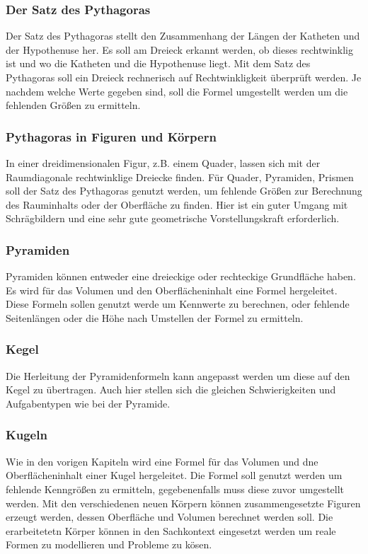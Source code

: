 \documentclass{article}
\begin{document}
\subsubsection*{Der Satz des Pythagoras}
Der Satz des Pythagoras stellt den Zusammenhang der Längen der Katheten und der Hypothenuse her.
Es soll am Dreieck erkannt werden, ob dieses rechtwinklig ist und wo die Katheten und die Hypothenuse liegt.
Mit dem Satz des Pythagoras soll ein Dreieck rechnerisch auf Rechtwinkligkeit überprüft werden. 
Je nachdem welche Werte gegeben sind, soll die Formel umgestellt werden um die fehlenden Größen zu ermitteln.
\subsubsection*{Pythagoras in Figuren und Körpern}
In einer dreidimensionalen Figur, z.B. einem Quader, lassen sich mit der Raumdiagonale rechtwinklige Dreiecke finden.
Für Quader, Pyramiden, Prismen soll der Satz des Pythagoras genutzt werden, um fehlende Größen zur Berechnung des Rauminhalts oder der Oberfläche zu finden.
Hier ist ein guter Umgang mit Schrägbildern und eine sehr gute geometrische Vorstellungskraft erforderlich.

\subsubsection*{Pyramiden}
Pyramiden können entweder eine dreieckige oder rechteckige Grundfläche haben. Es wird für das Volumen und den Oberflächeninhalt eine Formel hergeleitet.
Diese Formeln sollen genutzt werde um Kennwerte zu berechnen, oder fehlende Seitenlängen oder die Höhe nach Umstellen der Formel zu ermitteln.

\subsubsection*{Kegel}
Die Herleitung der Pyramidenformeln kann angepasst werden um diese auf den Kegel zu übertragen.
Auch hier stellen sich die gleichen Schwierigkeiten und Aufgabentypen wie bei der Pyramide.
\subsubsection*{Kugeln}
Wie in den vorigen Kapiteln wird eine Formel für das Volumen und dne Oberflächeninhalt einer Kugel hergeleitet.
Die Formel soll genutzt werden um fehlende Kenngrößen zu ermitteln, gegebenenfalls muss diese zuvor umgestellt werden.
Mit den verschiedenen neuen Körpern können zusammengesetzte Figuren erzeugt werden, dessen Oberfläche und Volumen berechnet werden soll.
Die erarbeitetetn Körper können in den Sachkontext eingesetzt werden um reale Formen zu modellieren und Probleme zu kösen.
\end{document}
